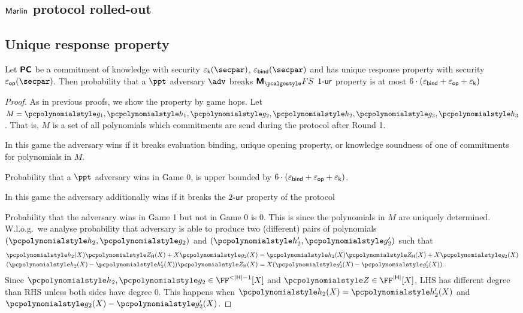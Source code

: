 \documentclass[runningheads,11pt]{llncs}
\begin{document}
\subsection{${\textnormal{\textsf{Marlin}}}$ protocol rolled-out}
\subsection{Unique response property}
\begin{lemma}
  Let $\bm{\mathsf{PC}}$ be a commitment of knowledge with security $\epsk(\secpar)$,
  $\epsbind(\secpar)$ and has unique response property with security
  $\epsop(\secpar)$. Then probability that a $\ppt$ adversary $\adv$ breaks
  $\marlinprotfs$ ${1\text{-}\mathsf{ur}}$ property is at most
  $6 \cdot (\varepsilon_{\mathsf{bind}} + \varepsilon_{\mathsf{op}} + \varepsilon_{\mathsf{k}})$ 
\end{lemma}
\begin{proof}
  As in previous proofs, we show the property by game hops. Let
  $M = \p{g_1}, \p{h_1}, \p{g_2}, \p{h_2}, \p{g_3}, \p{h_3}$. That is, $M$ is a
  set of all polynomials which commitments are send during the protocol after
  Round 1.

   In this game the adversary wins if it breaks evaluation
  binding, unique opening property, or knowledge soundness of one of commitments
  for polynomials in $M$.

  Probability that a $\ppt$ adversary wins in Game 0, is upper bounded by $6
  \cdot (\varepsilon_{\mathsf{bind}} + \varepsilon_{\mathsf{op}} + \varepsilon_{\mathsf{k}})$.

   In this game the adversary additionally wins if it breaks the
  ${2\text{-}\mathsf{ur}}$ property of the protocol

   Probability that the adversary wins in
  Game 1 but not in Game 0 is $0$. This is since the polynomials in $M$ are
  uniquely determined. W.l.o.g.~we analyse probability that adversary is able to
  produce two (different) pairs of polynomials $(\p{h_2}, \p{g_2})$ and $(\p{h'_2},
  \p{g'_2})$ such that
  \begin{align*}
    \p{h_2} (X) \ZERO_{\HHH} (X) + X \p{g_2} (X) & = \p{h_2} (X) \ZERO_{\HHH} (X) +
                                                   X \p{g_2} (X)\\
    (\p{h_2} (X) - \p{h'_2} (X)) \ZERO_{\HHH} (X) & = X (\p{g'_2} (X) - \p{g'_2}
    (X)).
  \end{align*}
  Since $\p{h_2}, \p{g_2} \in \FF^{< |\HHH| - 1} [X]$ and
  $\ZERO \in \FF^{|\HHH|} [X]$, LHS has different degree than RHS unless both
  sides have degree $0$. This happens when $\p{h_2} (X) = \p{h'_2} (X)$ and
  $\p{g_2} (X) - \p{g'_2} (X)$.
\end{proof}
\end{document}
